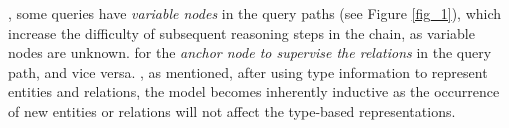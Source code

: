 %
, some queries have \textit{variable nodes} in the query paths (see Figure \ref{fig_1}), %
which increase the difficulty of subsequent  reasoning steps in the chain, as variable nodes are unknown.  for  the \textit{anchor node to supervise the relations} in the query path, and vice versa. %
, as mentioned,  after using type information to represent entities and relations, the model becomes inherently inductive as the occurrence of new entities or relations will not affect the type-based representations. %
